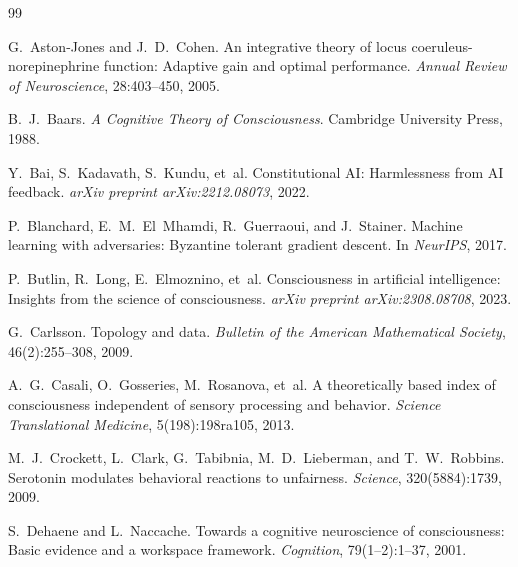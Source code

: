 \documentclass[12pt]{book}
\begin{document}
\begin{thebibliography}{99}

G.~Aston-Jones and J.~D.~Cohen.
\newblock An integrative theory of locus coeruleus-norepinephrine function: Adaptive gain and optimal performance.
\newblock \textit{Annual Review of Neuroscience}, 28:403--450, 2005.

B.~J.~Baars.
\newblock \textit{A Cognitive Theory of Consciousness}.
\newblock Cambridge University Press, 1988.

Y.~Bai, S.~Kadavath, S.~Kundu, et~al.
\newblock Constitutional AI: Harmlessness from AI feedback.
\newblock \textit{arXiv preprint arXiv:2212.08073}, 2022.

P.~Blanchard, E.~M.~El~Mhamdi, R.~Guerraoui, and J.~Stainer.
\newblock Machine learning with adversaries: Byzantine tolerant gradient descent.
\newblock In \textit{NeurIPS}, 2017.

P.~Butlin, R.~Long, E.~Elmoznino, et~al.
\newblock Consciousness in artificial intelligence: Insights from the science of consciousness.
\newblock \textit{arXiv preprint arXiv:2308.08708}, 2023.

G.~Carlsson.
\newblock Topology and data.
\newblock \textit{Bulletin of the American Mathematical Society}, 46(2):255--308, 2009.

A.~G.~Casali, O.~Gosseries, M.~Rosanova, et~al.
\newblock A theoretically based index of consciousness independent of sensory processing and behavior.
\newblock \textit{Science Translational Medicine}, 5(198):198ra105, 2013.

M.~J.~Crockett, L.~Clark, G.~Tabibnia, M.~D.~Lieberman, and T.~W.~Robbins.
\newblock Serotonin modulates behavioral reactions to unfairness.
\newblock \textit{Science}, 320(5884):1739, 2009.

S.~Dehaene and L.~Naccache.
\newblock Towards a cognitive neuroscience of consciousness: Basic evidence and a workspace framework.
\newblock \textit{Cognition}, 79(1--2):1--37, 2001.


\end{thebibliography}
\end{document}
